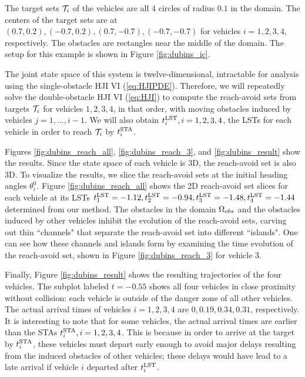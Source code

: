 The target sets $\mathcal{T}_i$ of the vehicles are all 4 circles of radius $0.1$ in the domain. The centers of the target sets are at $(0.7, 0.2), (-0.7, 0.2), (0.7, -0.7), (-0.7, -0.7)$ for vehicles $i=1,2,3,4$, respectively. The obstacles are rectangles near the middle of the domain. %
The setup for this example is shown in Figure \ref{fig:dubins_ic}. 

The joint state space of this system is twelve-dimensional, intractable for analysis using the single-obstacle HJI VI (\ref{eq:HJIPDE}). Therefore, we will repeatedly solve the double-obstacle HJI VI (\ref{eq:HJI}) to compute the reach-avoid sets from targets $\mathcal{T}_i$ for vehicles $1,2,3,4$, in that order, with moving obstacles induced by vehicles $j=1,\ldots,i-1$. We will also obtain $t^{\text{LST}}_i,i=1,2,3,4$, the LSTs for each vehicle in order to reach $\mathcal{T}_i$ by $t^{\text{STA}}_i$.

Figures \ref{fig:dubins_reach_all}, \ref{fig:dubins_reach_3}, and \ref{fig:dubins_result} show the results. Since the state space of each vehicle is 3D, the reach-avoid set is also 3D. To visualize the results, we slice the reach-avoid sets at the initial heading angles $\theta_i^0$. Figure \ref{fig:dubins_reach_all} shows the 2D reach-avoid set slices for each vehicle at its LSTs $t^{\text{LST}}_1=-1.12, t^{\text{LST}}_2=-0.94,t^{\text{LST}}_3=-1.48,t^{\text{LST}}_4=-1.44$ determined from our method. The obstacles in the domain $\Omega_{obs}$ and the obstacles induced by other vehicles inhibit the evolution of the reach-avoid sets, carving out thin ``channels" that separate the reach-avoid set into different ``islands". One can see how these channels and islands form by examining the time evolution of the reach-avoid set, shown in Figure \ref{fig:dubins_reach_3} for vehicle 3. 

Finally, Figure \ref{fig:dubins_result} shows the resulting trajectories of the four vehicles. The subplot labeled $t=-0.55$ shows all four vehicles in close proximity without collision: each vehicle is outside of the danger zone of all other vehicles. The actual arrival times of vehicles $i=1,2,3,4$ are $0, 0.19, 0.34, 0.31$, respectively. It is interesting to note that for some vehicles, the actual arrival times are earlier than the STAs $t^{\text{STA}}_i, i=1,2,3,4$. This is because in order to arrive at the target by $t^{\text{STA}}_i$, these vehicles must depart early enough to avoid major delays  resulting from the induced obstacles of other vehicles; these delays would have lead to a late arrival if vehicle $i$ departed after $t^{\text{LST}}_i$.

